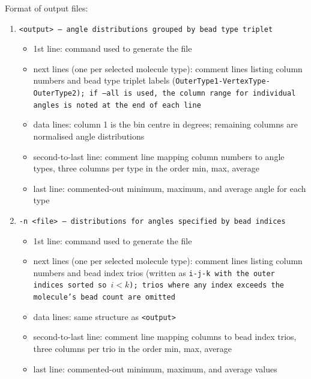 \noindent
Format of output files:
\begin{enumerate}[nosep,leftmargin=20pt]
  \item \tt{<output>} --- angle distributions grouped by bead type triplet
    \begin{itemize}[nosep,leftmargin=5pt]
      \item 1st line: command used to generate the file
      \item next lines (one per selected molecule type): comment lines listing
        column numbers and bead type triplet labels
        (\tt{OuterType1-VertexType-OuterType2}); if \tt{--all} is used, the
        column range for individual angles is noted at the end of each line
      \item data lines: column 1 is the bin centre in degrees; remaining
        columns are normalised angle distributions
      \item second-to-last line: comment line mapping column numbers to angle
        types, three columns per type in the order min, max, average
      \item last line: commented-out minimum, maximum, and average angle for
        each type
    \end{itemize}
  \item \tt{-n <file>} --- distributions for angles specified by bead indices
    \begin{itemize}[nosep,leftmargin=5pt]
      \item 1st line: command used to generate the file
      \item next lines (one per selected molecule type): comment lines listing
        column numbers and bead index trios (written as \tt{i-j-k} with the
        outer indices sorted so $i < k$); trios where any index exceeds the
        molecule's bead count are omitted
      \item data lines: same structure as \tt{<output>}
      \item second-to-last line: comment line mapping columns to bead index
        trios, three columns per trio in the order min, max, average
      \item last line: commented-out minimum, maximum, and average values
    \end{itemize}
\end{enumerate}

